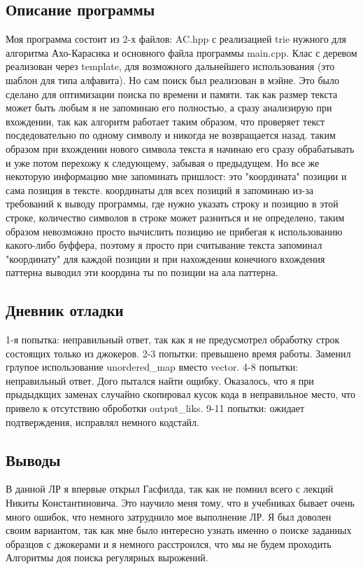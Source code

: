 \documentclass[12pt]{article}
\begin{document}
\subsection*{Описание программы}

Моя программа состоит из 2-х файлов: AC.hpp с реализацией trie нужного для 
алгоритма Ахо-Карасика и основного файла программы main.cpp. Клас с деревом
реализован через template, для возможного дальнейшего использования (это 
шаблон для типа алфавита). Но сам поиск был реализован в мэйне. Это было
сделано для оптимизации поиска по времени и памяти. так как размер текста
может быть любым я не запоминаю его полностью, а сразу анализирую при 
вхождении, так как алгоритм работает таким образом, что проверяет текст 
посдедовательно по одному символу и никогда не возвращается назад. таким 
образом при вхождении нового символа текста я начинаю его сразу обрабатывать 
и уже потом перехожу к следующему, забывая о предыдущем. Но все же 
некоторую информацию мне запоминать пришлост: это "координата" позиции
и сама позиция в тексте. координаты для всех позиций я запоминаю из-за 
требований к выводу программы, где нужно указать строку и позицию в этой 
строке, количество символов в строке может разниться и не определено,
таким образом невозможно просто вычислить позицию не прибегая к 
использованию какого-либо буффера, поэтому я просто при считывание текста
запоминал "координату" для каждой позиции и при нахождении конечного
вхождения паттерна выводил эти координа ты по позиции на ала паттерна.

\subsection*{Дневник отладки}

1-я попытка: неправильный ответ, так как я не предусмотрел обработку строк
 состоящих только из джокеров.
2-3 попытки: превышено время работы. Заменил грлупое использование unordered_map 
вместо vector.
4-8 попытки: неправильный ответ. Дого пытался найти ощибку. Оказалось, что я при 
прыдыдкщих заменах случайно скопировал кусок кода в неправильное место, 
что привело к отсутствию оброботки output_liks.
9-11 попытки: ожидает подтверждения, исправлял немного кодстайл.


\subsection*{Выводы}

В данной ЛР я впервые открыл Гасфилда, так как не помнил всего с лекций 
Никиты Константиновича. Это научило меня тому, что в учебниках бывает очень 
много ошибок, что немного затруднило мое выполнение ЛР. Я был доволен своим 
вариантом, так как мне было интересно узнать именно о поиске заданных образцов 
с джокерами и я немного расстроился, что мы не будем проходить Алгоритмы доя 
поиска регулярных вырожений.
\end{document}
